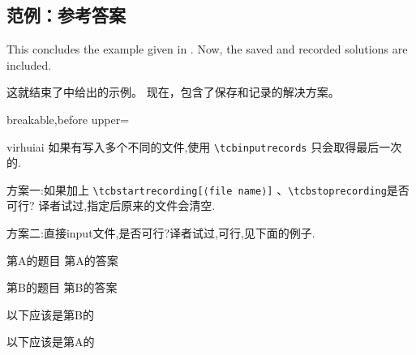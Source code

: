 \subsection{范例：参考答案}\label{sec:recording-solutions}
This concludes the example given in .
Now, the saved and recorded solutions are included.

这就结束了中给出的示例。%
现在，包含了保存和记录的解决方案。


\begin{dispListing*}{breakable,before upper=}
\tcbinputrecords
\end{dispListing*}
\tcbusetemp

\begin{引述之言}{virhuiai}
如果有写入多个不同的文件,使用 \verb|\tcbinputrecords| 只会取得最后一次的.

方案一:如果加上 \verb|\tcbstartrecording[⟨file name⟩]| 、\verb|\tcbstoprecording|是否可行? 译者试过,指定后原来的文件会清空.

方案二:直接input文件,是否可行?译者试过,可行,见下面的例子.
\end{引述之言}

\begin{exercise}
第A的题目
\tcblower
第A的答案
\end{exercise}

\tcbstoprecording


\begin{exercise}
第B的题目
\tcblower
第B的答案
\end{exercise}
\tcbstoprecording

以下应该是第B的
\tcbinputrecords

以下应该是第A的
 